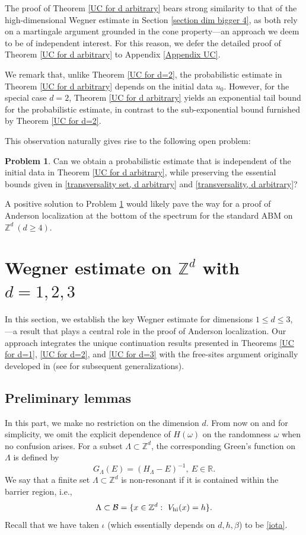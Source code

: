\documentclass[11pt,reqno,UTF8,twoside]{amsart}
\newcommand{\Z}{\mathbb{Z}}
\newcommand{\R}{\mathbb{R}}
\newcommand{\mcB}{\mathcal{B}}
\theoremstyle{definition}
\newtheorem{prob}[thm]{Problem}
\numberwithin{equation}{section}
\begin{document}
The proof of Theorem \ref{UC for d arbitrary} bears strong similarity to that of the high-dimensional Wegner estimate in Section \ref{section dim bigger 4}, as both rely on a martingale argument grounded in the cone property—an approach we deem to be of independent interest. For this reason, we defer the detailed proof of Theorem \ref{UC for d arbitrary} to Appendix \ref{Appendix UC}.

We remark  that, unlike Theorem \ref{UC for d=2}, the probabilistic estimate in Theorem \ref{UC for d arbitrary}  depends on   the initial data $u_0$. However,  for the special case   $d=2$, Theorem \ref{UC for d arbitrary} yields an exponential tail bound for the probabilistic estimate, in contrast to the sub-exponential bound furnished by Theorem \ref{UC for d=2}.
 
This observation naturally gives rise to the following open problem:

\begin{prob}\label{uniform initial data}
Can we obtain a probabilistic  estimate that is independent of  the initial data in Theorem \ref{UC for d arbitrary}, while preserving the essential bounds given in \eqref{transversality set, d arbitrary} and \eqref{transversality, d arbitrary}?
\end{prob}

A positive solution to Problem \ref{uniform initial data} would likely pave the way for a proof of Anderson localization at the bottom of the spectrum for the standard ABM on $\mathbb{Z}^d \ (d\geq 4)$.





\section{Wegner estimate on $\Z^d$ with  $d=1,2,3$}\label{section dim less 3}

In this section, we establish the key Wegner estimate for dimensions $1\leq d \leq 3$, —a result that plays a central role in the proof of Anderson localization. Our approach integrates the unique continuation results presented in Theorems \ref{UC for d=1}, \ref{UC for d=2}, and \ref{UC for d=3} with the free-sites argument originally developed in \cite{Bou04} (see \cite{BK05, DS20} for subsequent generalizations).


\subsection{Preliminary lemmas}
In this part,  we make no restriction on the dimension $d$.   From now on and for simplicity, we omit the explicit dependence of $H(\omega)$ on the randomness $\omega$ when no confusion arises. For a subset $\Lambda \subset \mathbb{Z}^d$, the corresponding Green's function on $\Lambda$ is defined by 
\[G_{\Lambda}(E)=(H_{\Lambda}-E)^{-1},\ E\in \R.\]
We say that  a finite set $\Lambda\subset\Z^d$ is  {non-resonant} if it is contained within the barrier region, i.e.,
\[\Lambda \subset \mcB =\{x\in \Z^d:\ V_{\rm hi}(x)=h \}.\]
Recall that we  have taken  $\iota$ (which essentially depends on $d,h,\beta$)  to be  \eqref{iota}. %
\end{document}
